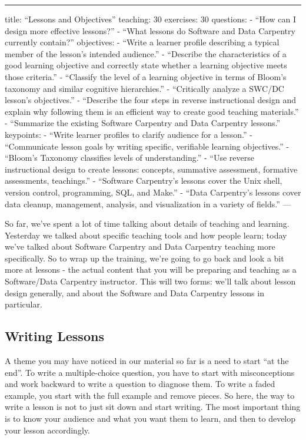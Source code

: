 \begin{center}
\rule{3in}{0.4pt}
\end{center}
title: ``Lessons and Objectives''
teaching: 30
exercises: 30
questions:
- ``How can I design more effective lessons?''
- ``What lessons do Software and Data Carpentry currently contain?''
objectives:
- ``Write a learner profile describing a typical member of the lesson's intended audience.''
- ``Describe the characteristics of a good learning objective and correctly state whether a learning objective meets those criteria.''
- ``Classify the level of a learning objective in terms of Bloom's taxonomy and similar cognitive hierarchies.''
- ``Critically analyze a SWC/DC lesson's objectives.''
- ``Describe the four steps in reverse instructional design and explain why following them is an efficient way to create good teaching materials.''
- ``Summarize the existing Software Carpentry and Data Carpentry lessons.''
keypoints:
- ``Write learner profiles to clarify audience for a lesson.''
- ``Communicate lesson goals by writing specific, verifiable learning objectives.''
- ``Bloom's Taxonomy classifies levels of understanding.''
- ``Use reverse instructional design to create lessons: concepts, summative assessment, formative assessments, teachings.''
- ``Software Carpentry's lessons cover the Unix shell, version control, programming, SQL, and Make.''
- ``Data Carpentry's lessons cover data cleanup, management, analysis, and visualization in a variety of fields.''
---

So far, we've spent a lot of time talking about details of teaching and learning.\newline
Yesterday we talked about specific teaching tools and how people learn; today 
we've talked about Software Carpentry and Data Carpentry teaching more specifically.\newline
So to wrap up the training, we're going to go back and look a bit more at lessons - 
the actual content that you will be preparing and teaching as a 
Software/Data Carpentry instructor.  This will two forms: we'll talk about 
lesson design generally, and about the Software and Data Carpentry lessons in particular.

\subsection*{Writing Lessons}

A theme you may have noticed in our material so far is a need to start 
``at the end''.  To write a multiple-choice question, you have to start with\newline
misconceptions and work backward to write a question to diagnose 
them.  To write a faded example, you start with the full example and remove 
pieces.  So here, the way to write a lesson is not to just sit down and 
start writing.  The most important thing 
is to know your audience and what you want them to learn, and then to 
develop your lesson accordingly.

